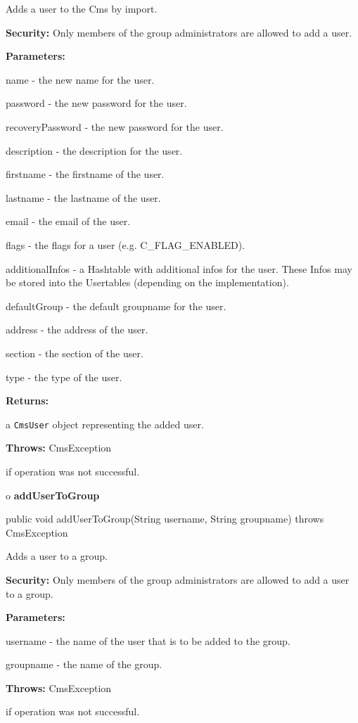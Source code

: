 \begin{description}
\htmlDD Adds a user to the Cms by import. 

{\bf Security:} Only members of the group administrators are allowed to add a
user. 

\begin{description}
\item {\bf Parameters:}  

name - the new name for the user.  

password - the new password for the user.  

recoveryPassword - the new password for the user.  

description - the description for the user.  

firstname - the firstname of the user.  

lastname - the lastname of the user.  

email - the email of the user.  

flags - the flags for a user (e.g. C\_FLAG\_ENABLED).  

additionalInfos - a Hashtable with additional infos for the user. These Infos
may be stored into the Usertables (depending on the implementation).  

defaultGroup - the default groupname for the user.  

address - the address of the user.  

section - the section of the user.  

type - the type of the user.  
\item {\bf Returns:}  

a {\tt CmsUser} object representing the added user.  
\item {\bf Throws:} CmsException  

if operation was not successful.  
\end{description}

\end{description}

o {\bf addUserToGroup} 

\begin{PRE}
 public void addUserToGroup(String username,
                            String groupname) throws CmsException
\end{PRE}

\begin{description}
\htmlDD Adds a user to a group. 

{\bf Security:} Only members of the group administrators are allowed to add a
user to a group. 

\begin{description}
\item {\bf Parameters:}  

username - the name of the user that is to be added to the group.  

groupname - the name of the group.  
\item {\bf Throws:} CmsException  

if operation was not successful.  
\end{description}

\end{description}

